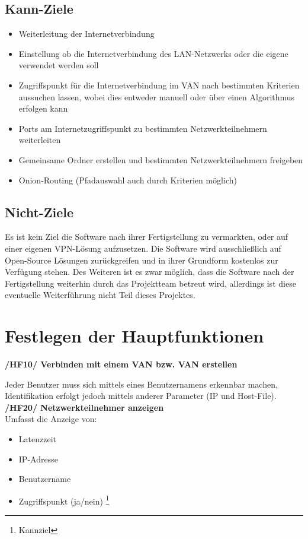 \documentclass[a4paper,12pt]{scrreprt}
\begin{document}
		\subsection{Kann-Ziele}
			\begin{itemize}
			\item Weiterleitung der Internetverbindung
			\item Einstellung ob die Internetverbindung des LAN-Netzwerks oder die eigene verwendet werden soll
			\item Zugriffspunkt für die Internetverbindung im VAN nach bestimmten Kriterien aussuchen lassen, wobei dies entweder manuell oder über einen Algorithmus erfolgen kann
			
			\item Ports am Internetzugriffspunkt zu bestimmten Netzwerkteilnehmern weiterleiten
			\item Gemeinsame Ordner erstellen und bestimmten Netzwerkteilnehmern freigeben
			
			\item Onion-Routing (Pfadauswahl auch durch Kriterien möglich)
			
			\end{itemize}
			
		\subsection{Nicht-Ziele}
			Es ist kein Ziel die Software nach ihrer Fertigstellung zu vermarkten, oder auf einer eigenen VPN-Lösung aufzusetzen. Die Software wird ausschließlich auf Open-Source Lösungen zurückgreifen und in ihrer Grundform kostenlos zur Verfügung stehen. Des Weiteren ist es zwar möglich, dass die Software nach der Fertigstellung weiterhin durch das Projektteam betreut wird, allerdings ist diese eventuelle Weiterführung nicht Teil dieses Projektes.
			
	\section{Festlegen der Hauptfunktionen}
		\textbf{/HF10/ Verbinden mit einem VAN bzw. VAN erstellen}
		
		Jeder Benutzer muss sich mittels eines Benutzernamens erkennbar machen, Identifikation erfolgt jedoch mittels anderer Parameter (IP und Host-File). \\
		
		
		\textbf {/HF20/ Netzwerkteilnehmer anzeigen
		}\\
		Umfasst die Anzeige von:
		\begin{itemize}
		
	
		\item Latenzzeit
		\item IP-Adresse
		\item Benutzername
		\item Zugriffspunkt (ja/nein) \footnote{Kannziel}\\
			\end{itemize}
		
\end{document}
